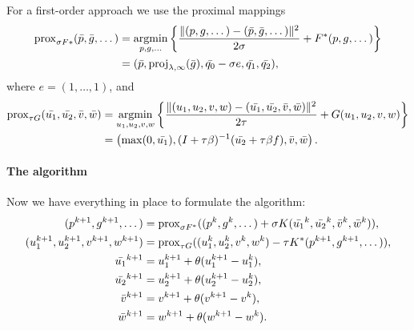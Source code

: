 For a first-order approach we use the proximal mappings
\begin{align*}
    \Prox_{\sigma F*}(\bar{p},\bar{g},\dots)
    &= \argmin_{p,g,\dots} \left\{
        \frac{\|
            (p,g,\dots)-(\bar{p},\bar{g},\dots)
        \|^2}{2\sigma} + F^*(p,g,\dots)
    \right\} \\
    &= (\bar{p},\proj_{\lambda,\infty}(\bar{g}),\bar{q_0}-\sigma e,\bar{q_1},\bar{q_2}),
\end{align*}
where $e = (1,\dots,1)$, and
\begin{align*}
    \Prox_{\tau G}(\bar{u_1},\bar{u_2},\bar{v},\bar{w})
    &= \argmin_{u_1,u_2,v,w} \left\{
        \frac{\|
            (u_1,u_2,v,w)-(\bar{u_1},\bar{u_2},\bar{v},\bar{w})
        \|^2}{2\tau} + G(u_1,u_2,v,w)
    \right\} \\
    &= \left(
        \max(0,\bar{u_1}),
        (I+\tau \beta)^{-1}(\bar{u_2} + \tau \beta f),
        \bar{v},
        \bar{w}
    \right).
\end{align*}

\paragraph{The algorithm}

Now we have everything in place to formulate the algorithm:
\begin{align*}
    (p^{k+1},g^{k+1},\dots) &= \operatorname{prox}_{\sigma F^*}(
        (p^{k},g^{k},\dots)
        + \sigma K(\bar{u_1}^{k},\bar{u_2}^{k},\bar{v}^{k},\bar{w}^{k})
    ), \\
    (u_1^{k+1},u_2^{k+1},v^{k+1},w^{k+1}) &= \operatorname{prox}_{\tau G}(
        (u_1^{k},u_2^{k},v^{k},w^{k})
        - \tau K^*(p^{k+1},g^{k+1},\dots)
    ), \\
    \bar{u_1}^{k+1} &= u_1^{k+1} + \theta(u_1^{k+1}-u_1^{k}), \\
    \bar{u_2}^{k+1} &= u_2^{k+1} + \theta(u_2^{k+1}-u_2^{k}), \\
    \bar{v}^{k+1} &= v^{k+1} + \theta(v^{k+1}-v^{k}), \\
    \bar{w}^{k+1} &= w^{k+1} + \theta(w^{k+1}-w^{k}).
\end{align*}


